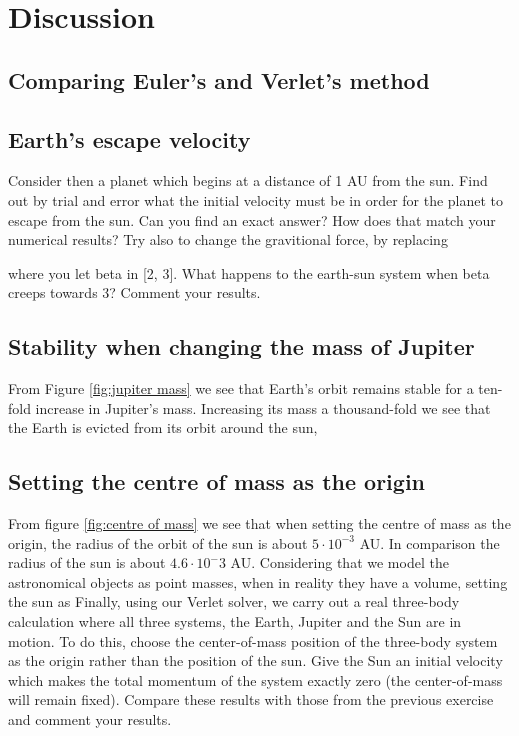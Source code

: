 \section{Discussion}
\label{sec:discussion}

\subsection{Comparing Euler's and Verlet's method}

\subsection{Earth's escape velocity}
Consider then a planet which begins at a
distance of 1 AU from the sun. Find out by trial and error what the initial
velocity must be in order for the planet to escape from the sun. Can you find an
exact answer? How does that match your numerical results?
Try also to change the gravitional force, by replacing

where you let beta in [2, 3]. What happens to the earth-sun system when beta creeps
towards 3? Comment your results.


\subsection{Stability when changing the mass of Jupiter}

From Figure \ref{fig:jupiter mass} we see that Earth's orbit remains stable for a
ten-fold increase in Jupiter's mass. Increasing its mass a thousand-fold we see
that the Earth is evicted from its orbit around the sun,

\subsection{Setting the centre of mass as the origin}
From figure \ref{fig:centre of mass} we see that when setting the centre of mass as the origin, the radius of the orbit of the sun is about $5\cdot 10^{-3}$ AU. In comparison the radius of the sun is about $4.6\cdot 10^-3{}$ AU. Considering that we model the astronomical objects as point masses, when in reality they have a volume, setting the sun as
Finally,
using our Verlet solver, we carry out a real three-body calculation where all
three systems, the Earth, Jupiter and the Sun are in motion. To do this, choose
the center-of-mass position of the three-body system as the origin rather than
the position of the sun. Give the Sun an initial velocity which makes the total
momentum of the system exactly zero (the center-of-mass will remain fixed).
Compare these results with those from the previous exercise and comment your
results.

